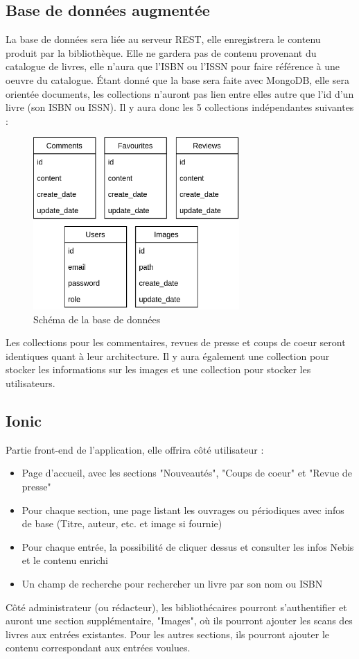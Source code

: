 \documentclass[a4paper, 12pt]{article}
\begin{document}
\subsection{Base de données augmentée}
La base de données sera liée au serveur REST, elle enregistrera le contenu produit par la bibliothèque. Elle ne gardera pas
de contenu provenant du catalogue de livres, elle n'aura que l'ISBN ou l'ISSN pour faire référence à une oeuvre du catalogue.
Étant donné que la base sera faite avec MongoDB, elle sera orientée documents, les collections n'auront pas lien entre elles
autre que l'id d'un livre (son ISBN ou ISSN). Il y aura donc les 5 collections indépendantes suivantes :
\begin{figure}
    \begin{center}
        \includegraphics[width=0.7\textwidth]{images/bdd.png}
    \end{center}
    \caption{Schéma de la base de données}
\end{figure}
Les collections pour les commentaires, revues de presse et coups de coeur seront identiques quant à leur architecture. Il y
aura également une collection pour stocker les informations sur les images et une collection pour stocker les utilisateurs.

\subsection{Ionic}
Partie front-end de l'application, elle offrira côté utilisateur :
\begin{itemize}
    \item Page d'accueil, avec les sections "Nouveautés", "Coups de coeur" et "Revue de presse"
    \item Pour chaque section, une page listant les ouvrages ou périodiques avec infos de base
        (Titre, auteur, etc. et image si fournie)
    \item Pour chaque entrée, la possibilité de cliquer dessus et consulter les infos Nebis et le contenu enrichi
    \item Un champ de recherche pour rechercher un livre par son nom ou ISBN
\end{itemize}
Côté administrateur (ou rédacteur), les bibliothécaires pourront s'authentifier et auront une section supplémentaire,
"Images", où ils pourront ajouter les scans des livres aux entrées existantes. Pour les autres sections, ils
pourront ajouter le contenu correspondant aux entrées voulues.
\end{document}
